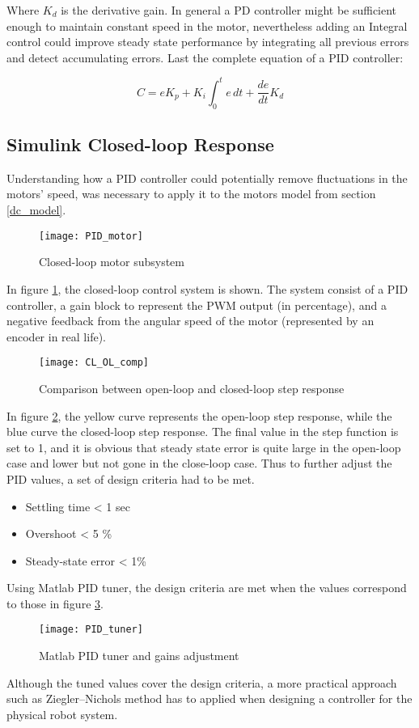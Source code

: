 Where $K_d$ is the derivative gain. 
In general a PD controller might be sufficient enough to maintain constant speed in the motor, nevertheless adding an Integral control could improve steady state performance by integrating all previous errors and detect accumulating errors. Last the complete equation of a PID controller:

\begin{equation}
C = eK_p + K_i\int_{0}^{t} e \,dt + \frac{de}{dt}K_d
\end{equation} 

\subsection{Simulink Closed-loop Response} 

Understanding how a PID controller could potentially remove fluctuations in the motors' speed, was necessary to apply it to the motors model from section \ref{dc_model}. 

\begin{figure}[h]
\centering
\texttt{[image: PID\_motor]}
\caption{Closed-loop motor subsystem}
\label{fig::PID_motor}
\end{figure}

In figure \ref{fig::PID_motor}, the closed-loop control system is shown. The system consist of a PID controller, a gain block to represent the PWM output (in percentage), and a negative feedback from the angular speed of the motor (represented by an encoder in real life). 

\begin{figure}[h]
\centering
\texttt{[image: CL\_OL\_comp]}
\caption{Comparison between open-loop and closed-loop step response}
\label{fig::PID_comp}
\end{figure}

In figure \ref{fig::PID_comp}, the yellow curve represents the open-loop step response, while the blue curve the closed-loop step response. The final value in the step function is set to 1, and it is obvious that steady state error is quite large in the open-loop case and lower but not gone in the close-loop case. Thus to further adjust the PID values, a set of design criteria had to be met.

\begin{itemize}
\item Settling time < 1 sec
\item Overshoot < 5 \%
\item Steady-state error < 1\%
\end{itemize} 

Using Matlab PID tuner, the design criteria are met when the values correspond to those in figure \ref{fig::PID_tuner}.

\begin{figure}[h]
\centering
\texttt{[image: PID\_tuner]}
\caption{Matlab PID tuner and gains adjustment}
\label{fig::PID_tuner}
\end{figure}

Although the tuned values cover the design criteria, a more practical approach such as Ziegler–Nichols method has to applied when designing a controller for the physical robot system. 